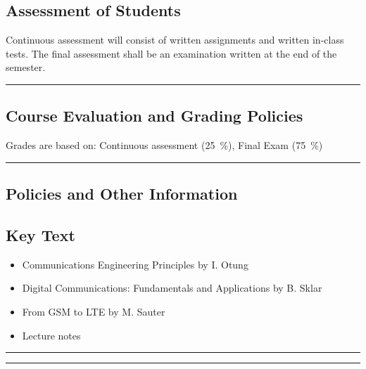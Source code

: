 \subsection*{Assessment of Students}
\begin{outline}
    \1 Continuous assessment will consist of written assignments and written in-class tests.
    \1 The final assessment shall be an examination written at the end of the semester.
\end{outline}
\vspace{2ex}\hrule\vspace{2ex}

\subsection*{Course Evaluation and Grading Policies}
Grades are based on:
Continuous assessment (\qty{25}{\percent}),
Final Exam (\qty{75}{\percent})
\vspace{2ex}\hrule\vspace{2ex}


\subsection*{Policies and Other Information}
\subsection*{Key Text}
\begin{itemize}
    \item Communications Engineering Principles by I. Otung
    \item Digital Communications: Fundamentals and Applications by B. Sklar
    \item From GSM to LTE by M. Sauter
    \item Lecture notes
\end{itemize}
\vspace{2ex}\hrule
\vspace{2ex}\hrule\vspace{2ex}